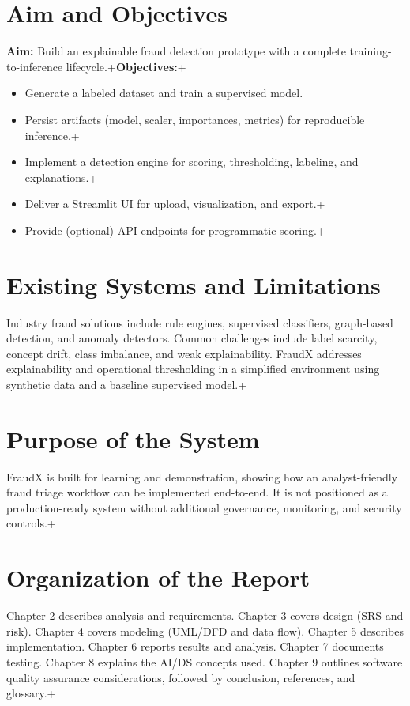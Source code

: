 \documentclass[12pt,a4paper]{report}
\begin{document}
\section{Aim and Objectives}
\textbf{Aim:} Build an explainable fraud detection prototype with a complete training-to-inference lifecycle.\n+\textbf{Objectives:}\n+\begin{itemize}
  \item Generate a labeled dataset and train a supervised model.
  \item Persist artifacts (model, scaler, importances, metrics) for reproducible inference.\n+  \item Implement a detection engine for scoring, thresholding, labeling, and explanations.\n+  \item Deliver a Streamlit UI for upload, visualization, and export.\n+  \item Provide (optional) API endpoints for programmatic scoring.\n+\end{itemize}

\section{Existing Systems and Limitations}
Industry fraud solutions include rule engines, supervised classifiers, graph-based detection, and anomaly detectors. Common challenges include label scarcity, concept drift, class imbalance, and weak explainability. FraudX addresses explainability and operational thresholding in a simplified environment using synthetic data and a baseline supervised model.\n+
\section{Purpose of the System}
FraudX is built for learning and demonstration, showing how an analyst-friendly fraud triage workflow can be implemented end-to-end. It is not positioned as a production-ready system without additional governance, monitoring, and security controls.\n+
\section{Organization of the Report}
Chapter 2 describes analysis and requirements. Chapter 3 covers design (SRS and risk). Chapter 4 covers modeling (UML/DFD and data flow). Chapter 5 describes implementation. Chapter 6 reports results and analysis. Chapter 7 documents testing. Chapter 8 explains the AI/DS concepts used. Chapter 9 outlines software quality assurance considerations, followed by conclusion, references, and glossary.\n+
\end{document}

